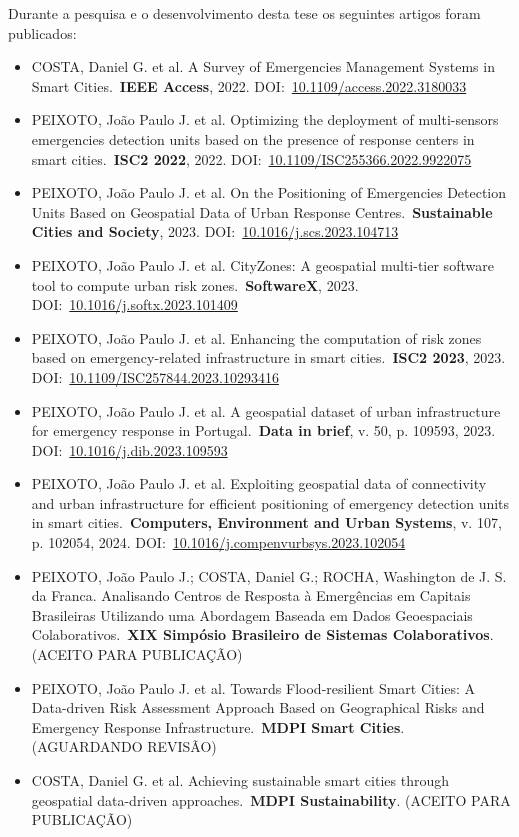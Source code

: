 \begin{refsection}
Durante a pesquisa e o desenvolvimento desta tese os seguintes artigos foram publicados:

\begin{itemize}
  \item COSTA, Daniel G. et al. A Survey of Emergencies Management Systems in Smart Cities.\ \textbf{IEEE Access}, 2022. DOI:\ \hyperref{https://doi.org/10.1109/access.2022.3180033}{}{}{10.1109/access.2022.3180033}
  \item PEIXOTO, João Paulo J. et al. Optimizing the deployment of multi-sensors emergencies detection units based on the presence of response centers in smart cities.\ \textbf{ISC2 2022}, 2022. DOI:\ \hyperref{https://doi.org/10.1109/ISC255366.2022.9922075}{}{}{10.1109/ISC255366.2022.9922075}
  \item PEIXOTO, João Paulo J. et al. On the Positioning of Emergencies Detection Units Based on Geospatial Data of Urban Response Centres.\ \textbf{Sustainable Cities and Society}, 2023. DOI:\ \hyperref{https://doi.org/10.1016/j.scs.2023.104713}{}{}{10.1016/j.scs.2023.104713}
  \item PEIXOTO, João Paulo J. et al. CityZones: A geospatial multi-tier software tool to compute urban risk zones.\ \textbf{SoftwareX}, 2023. DOI:\ \hyperref{https://doi.org/10.1016/j.softx.2023.101409}{}{}{10.1016/j.softx.2023.101409}
  \item PEIXOTO, João Paulo J. et al. Enhancing the computation of risk zones based on emergency-related infrastructure in smart cities.\ \textbf{ISC2 2023}, 2023. DOI:\ \hyperref{https://doi.org/10.1109/ISC257844.2023.10293416}{}{}{10.1109/ISC257844.2023.10293416}
  \item PEIXOTO, João Paulo J. et al. A geospatial dataset of urban infrastructure for emergency response in Portugal.\ \textbf{Data in brief}, v. 50, p. 109593, 2023. DOI:\ \hyperref{https://doi.org/10.1016/j.dib.2023.109593}{}{}{10.1016/j.dib.2023.109593}
  \item PEIXOTO, João Paulo J. et al. Exploiting geospatial data of connectivity and urban infrastructure for efficient positioning of emergency detection units in smart cities.\ \textbf{Computers, Environment and Urban Systems}, v. 107, p. 102054, 2024. DOI:\ \hyperref{https://doi.org/10.1016/j.compenvurbsys.2023.102054}{}{}{10.1016/j.compenvurbsys.2023.102054}
  \item PEIXOTO, João Paulo J.; COSTA, Daniel G.; ROCHA, Washington de J. S. da Franca. Analisando Centros de Resposta à Emergências em Capitais Brasileiras Utilizando uma Abordagem Baseada em Dados Geoespaciais Colaborativos.\ \textbf{XIX Simpósio Brasileiro de Sistemas Colaborativos}. (ACEITO PARA PUBLICAÇÃO)
  \item PEIXOTO, João Paulo J. et al. Towards Flood-resilient Smart Cities: A Data-driven Risk Assessment Approach Based on Geographical Risks and Emergency Response Infrastructure.\ \textbf{MDPI Smart Cities}. (AGUARDANDO REVISÃO)
  \item COSTA, Daniel G. et al. Achieving sustainable smart cities through geospatial data-driven approaches.\ \textbf{MDPI Sustainability}. (ACEITO PARA PUBLICAÇÃO)
\end{itemize}


\end{refsection}
